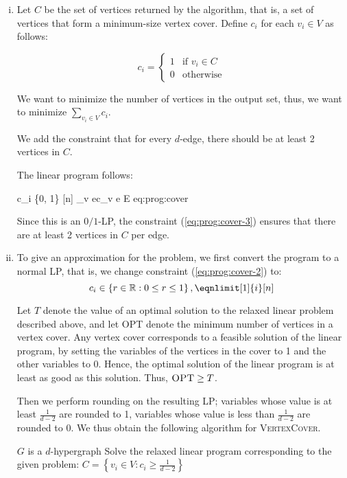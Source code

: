 \begin{enumerate}[(i)]
	\item Let $C$ be the set of vertices returned by the algorithm, that is, a set of vertices that form a minimum-size vertex cover.
		Define $c_i$ for each $v_i \in V$ as follows:

		\[
			c_i =
				\begin{cases}
					1   & \text{if } v_i \in C\\
					0   & \text{otherwise}
				\end{cases}
		\]

		We want to minimize the number of vertices in the output set, thus, we want to minimize $\sum_{v_i \in V} c_i$.

		We add the constraint that for every $d$-edge, there should be at least 2 vertices in $C$.

		The linear program follows:

			{c_i \in \left\{0, 1\right\}}    {[n]}
			{\sum_{v \in e}{c_v} }    {e \in E}
			{eq:prog:cover}

		Since this is an $0/1$-LP, the constraint (\ref{eq:prog:cover-3}) ensures that there are at least 2 vertices in $C$ per edge.
	\item To give an approximation for the problem, we first convert the program to a normal LP, that is, we change constraint (\ref{eq:prog:cover-2}) to:
		\[
			c_i \in \left\{r \in \mathbb{R}: 0 \leq r \leq 1\right\}, \eqnlimit[1]{i}[n]
		\]

		Let $T$ denote the value of an optimal solution to the relaxed linear problem described above, and let \textsc{OPT} denote the minimum number of vertices in a vertex cover.
		Any vertex cover corresponds to a feasible solution of the linear program, by setting the variables of the vertices in the cover to 1 and the other variables to 0.
		Hence, the optimal solution of the linear program is at least as good as this solution.
		Thus, $\textsc{OPT} \geq T$.

		Then we perform rounding on the resulting LP; variables whose value is at least $\frac{1}{d-2}$ are rounded to 1, variables whose value is less than $\frac{1}{d-2}$ are rounded to 0.
		We thus obtain the following algorithm for \textsc{VertexCover}.

		\begin{sourcecode}
$G$ is a $d$-hypergraph
Solve the relaxed linear program corresponding to the given problem: 
$C = \left\{v_i \in V: c_i \geq \frac{1}{d-2}\right\}$
\qend
		\end{sourcecode}


\end{enumerate}
